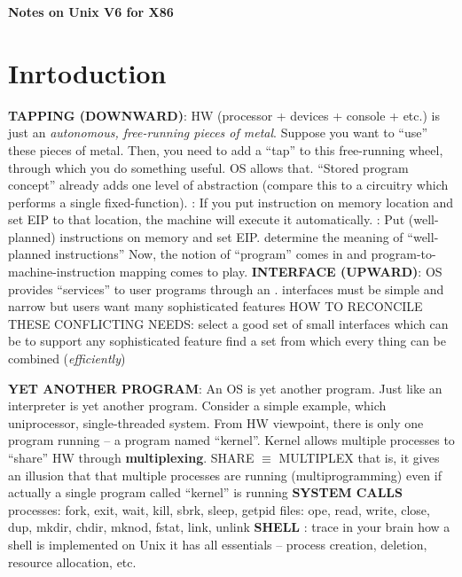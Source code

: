 \documentclass{note}
\begin{document}
\small

\begin{center}
{\large\bf \textcolor{blue2}{Notes on Unix V6 for X86}}
\end{center}

\vspace*{1cm}

\tableofcontents
\pagebreak

\section{Inrtoduction}
\bit
\w \textcolor{red2}{\bf TAPPING (DOWNWARD)}: HW (processor + devices + console + etc.) is just an \textcolor{red2}{\em
  autonomous, free-running pieces of metal\/}.  
  \bit
  \w Suppose you want to ``use'' these pieces of metal. Then, you need to add a
``tap'' to this free-running wheel, through which you do something useful.
  OS allows that.
  \w ``Stored program concept'' already adds one level of abstraction (compare
  this to a circuitry which performs a single fixed-function).
  \w {}:
     \bit
     \w If you put instruction on memory location and set EIP to that
     location,
       the machine will execute it automatically.
     \eit
  \w {}:
     \bit
     \w Put (well-planned) instructions on memory and set EIP.
     \w determine the meaning of ``well-planned instructions''
     \w Now, the notion of ``program'' comes in and
     program-to-machine-instruction mapping comes to play.
     \eit
  \eit
\w \textcolor{red2}{\bf INTERFACE (UPWARD)}: OS provides ``services'' to user programs through an .
   \bit
   \w interfaces must be \textcolor{red2}{simple and narrow}
   \w but users want many sophisticated features
   \w HOW TO RECONCILE THESE CONFLICTING NEEDS:
     \bit
     \w select a good set of small interfaces which can be  to
     support any sophisticated feature
     \w find a  set from which every thing can be combined
         ({\em efficiently\/})
     \eit
   \eit

\w \textcolor{red2}{\bf{}YET ANOTHER PROGRAM}: An OS is yet another
program. Just like an interpreter is yet another program. 
   \bit
   \w Consider a simple example, which uniprocessor, single-threaded system.
   \w \textcolor{red2}{From HW viewpoint, there is only one program running --
     a program named ``kernel''.}
   \w Kernel allows multiple processes to ``share'' HW through
   \textcolor{red2}{\bf multiplexing}. 
     \bit
     \w SHARE $\equiv$ MULTIPLEX
     \eit
   \w that is, it gives an illusion that that multiple processes are running
   (multiprogramming) even if actually a single program called ``kernel'' is
   running 
   \eit
\w \textcolor{red2}{\bf{}SYSTEM CALLS}
  \bit
  \w processes: fork, exit, wait, kill, sbrk, sleep, getpid
  \w files: ope, read, write, close, dup, mkdir, chdir, mknod, fstat, link,
  unlink
  \eit
\w \textcolor{red2}{\bf SHELL}
  \bit
  \w {}: trace in your brain how a shell is implemented
  on Unix 
  \w it has all essentials -- process creation, deletion, resource allocation,
  etc. 
  \eit
\eit
\end{document}
